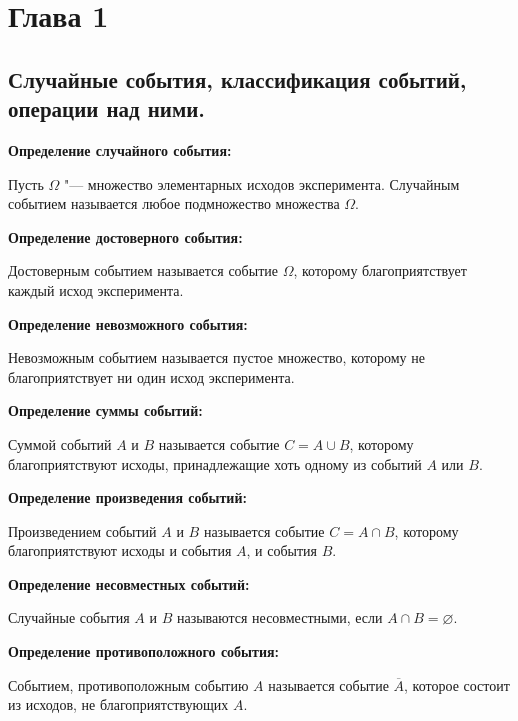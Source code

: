 


    
\tableofcontents

\newpage

\section{Глава 1}

\subsection{Случайные события, классификация событий, операции над ними.}

\textbf{Определение случайного события:}
    \smallskip

    Пусть $\Omega$ "--- множество элементарных
    исходов эксперимента. Случайным событием
    называется любое подмножество множества
    $\Omega$.
    \bigskip

\textbf{Определение достоверного события:}
    \smallskip

    Достоверным событием называется событие
    $\Omega$, которому благоприятствует
    каждый исход эксперимента.
    \bigskip

\textbf{Определение невозможного события:}
    \smallskip
    
    Невозможным событием называется пустое
    множество, которому не благоприятствует ни
    один исход эксперимента.
    \bigskip

\textbf{Определение суммы событий:}
    \smallskip

    Суммой событий $A$ и $B$ называется событие $C = A \cup B$,
    которому благоприятствуют исходы, принадлежащие хоть одному
    из событий $A$ или $B$.
    \bigskip

\textbf{Определение произведения событий:}
    \smallskip
    
    Произведением событий $A$ и $B$ называется событие 
    $C = A \cap B$, которому благоприятствуют исходы 
    и события $A$, и события $B$.
    \bigskip

\textbf{Определение несовместных событий:}
    \smallskip

    Случайные события $A$ и $B$ называются несовместными, если 
    $A \cap B = \varnothing$.
    \bigskip

\textbf{Определение противоположного события:}
    \smallskip
    
    Событием, противоположным событию 
    $A$ называется событие $\overline{A}$, которое
    состоит из исходов, не благоприятствующих $A$.
    \bigskip

